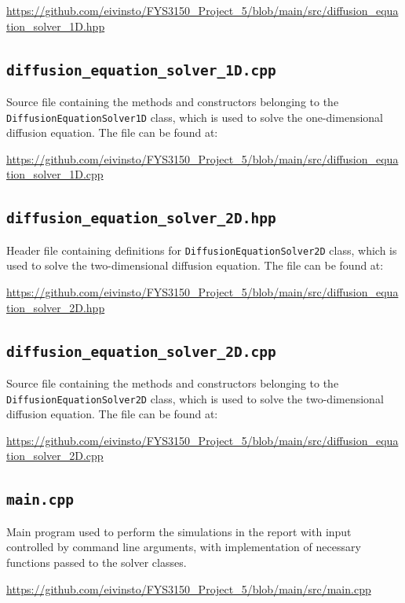 \documentclass[reprint,english,notitlepage]{revtex4-1}  %
\begin{document}
\url{https://github.com/eivinsto/FYS3150_Project_5/blob/main/src/diffusion_equation_solver_1D.hpp}


\cprotect\subsection{\verb+diffusion_equation_solver_1D.cpp+} \label{A.2}

Source file containing the methods and constructors belonging to the \verb+DiffusionEquationSolver1D+ class, which is used to solve the one-dimensional diffusion equation. The file can be found at:

\url{https://github.com/eivinsto/FYS3150_Project_5/blob/main/src/diffusion_equation_solver_1D.cpp}

\cprotect\subsection{\verb+diffusion_equation_solver_2D.hpp+} \label{A.3}

Header file containing definitions for \verb+DiffusionEquationSolver2D+ class, which is used to solve the two-dimensional diffusion equation. The file can be found at:

\url{https://github.com/eivinsto/FYS3150_Project_5/blob/main/src/diffusion_equation_solver_2D.hpp}


\cprotect\subsection{\verb+diffusion_equation_solver_2D.cpp+} \label{A.4}

Source file containing the methods and constructors belonging to the \verb+DiffusionEquationSolver2D+ class, which is used to solve the two-dimensional diffusion equation. The file can be found at:

\url{https://github.com/eivinsto/FYS3150_Project_5/blob/main/src/diffusion_equation_solver_2D.cpp}


\cprotect\subsection{\verb+main.cpp+} \label{A.5}

Main program used to perform the simulations in the report with input controlled by command line arguments, with implementation of necessary functions passed to the solver classes.

\url{https://github.com/eivinsto/FYS3150_Project_5/blob/main/src/main.cpp}
\end{document}

